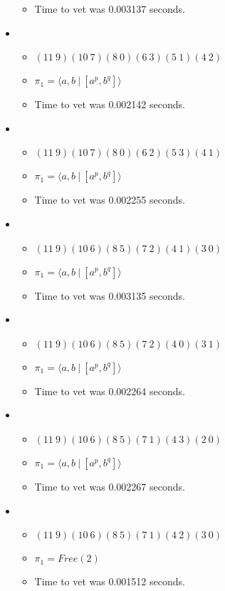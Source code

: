 \documentclass{article}
\begin{document}
\begin{itemize}
\begin{itemize}
      \item Time to vet was 0.003137 seconds.
\end{itemize}
\item \begin{itemize}
      \item $(11\ 9)(10\ 7)(8\ 0)(6\ 3)(5\ 1)(4\ 2)$
      \item $\pi_1 = \langle a,b\ |\ [a^p,b^q]\rangle$
      \item Time to vet was 0.002142 seconds.
\end{itemize}
\item \begin{itemize}
      \item $(11\ 9)(10\ 7)(8\ 0)(6\ 2)(5\ 3)(4\ 1)$
      \item $\pi_1 = \langle a,b\ |\ [a^p,b^q]\rangle$
      \item Time to vet was 0.002255 seconds.
\end{itemize}
\item \begin{itemize}
      \item $(11\ 9)(10\ 6)(8\ 5)(7\ 2)(4\ 1)(3\ 0)$
      \item $\pi_1 = \langle a,b\ |\ [a^p,b^q]\rangle$
      \item Time to vet was 0.003135 seconds.
\end{itemize}
\item \begin{itemize}
      \item $(11\ 9)(10\ 6)(8\ 5)(7\ 2)(4\ 0)(3\ 1)$
      \item $\pi_1 = \langle a,b\ |\ [a^p,b^q]\rangle$
      \item Time to vet was 0.002264 seconds.
\end{itemize}
\item \begin{itemize}
      \item $(11\ 9)(10\ 6)(8\ 5)(7\ 1)(4\ 3)(2\ 0)$
      \item $\pi_1 = \langle a,b\ |\ [a^p,b^q]\rangle$
      \item Time to vet was 0.002267 seconds.
\end{itemize}
\item \begin{itemize}
      \item $(11\ 9)(10\ 6)(8\ 5)(7\ 1)(4\ 2)(3\ 0)$
      \item $\pi_1 =Free(2)$
      \item Time to vet was 0.001512 seconds.

\end{itemize}
\end{itemize}
\end{document}
